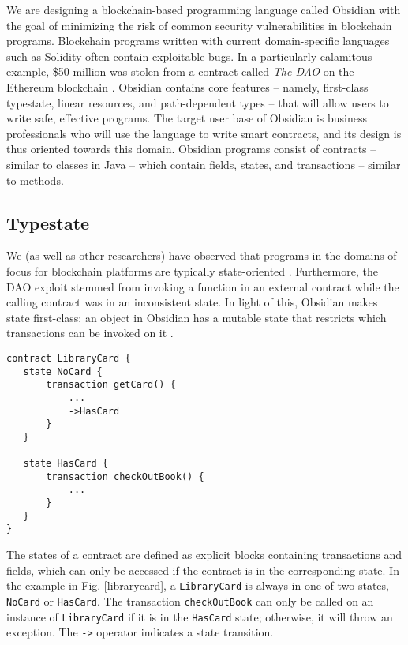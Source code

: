 \documentclass[sigplan,10pt,review]{acmart}\settopmatter{printfolios=true}
\begin{document}
We are designing a blockchain-based programming language called Obsidian \cite{Coblenz} with the goal of 
minimizing the risk of common security vulnerabilities in blockchain programs. Blockchain
programs written with current domain-specific languages such as Solidity \cite{Solidity} often contain
exploitable bugs. In a particularly calamitous example, \$50 million was stolen from a contract called \textit{The DAO} on the 
Ethereum blockchain \cite{Sirer}. Obsidian contains core features
 -- namely, first-class typestate, linear resources, and path-dependent types -- that will allow users 
to write safe, effective programs. The target 
user base of Obsidian is business professionals who will use the language to write smart contracts, 
and its design is thus oriented towards this domain. Obsidian programs consist of contracts --
similar to classes in Java -- which contain fields, states, and transactions -- similar to methods.

\subsection{Typestate}

We (as well as other researchers) have observed that programs in the domains of focus for blockchain platforms are typically state-oriented \cite{State}. Furthermore, the DAO exploit stemmed from invoking a function in an external contract while the calling contract was in an inconsistent state.
In light of this, Obsidian makes state first-class: an object in Obsidian has a mutable state that restricts which 
transactions can be invoked on it \cite{Aldrich}. 

\begin{lstlisting}[caption={An example of states in Obsidian.}, captionpos = b, label = librarycard]
contract LibraryCard {
   state NoCard {
       transaction getCard() {
           ...
           ->HasCard
       }
   }
  
   state HasCard {
       transaction checkOutBook() {
           ...
       }
   }
}
\end{lstlisting}

The states of a contract are defined as explicit blocks containing 
transactions and fields, which can only be accessed if the contract is in the corresponding state. 
In the example in Fig. \ref{librarycard}, a \texttt{\small{LibraryCard}} is always in one of two
states, \texttt{\small{NoCard}} or \texttt{\small{HasCard}}. The transaction 
\texttt{\small{checkOutBook}} can only be called on an instance of 
\texttt{\small{LibraryCard}} if it is in the \texttt{\small{HasCard}} state; otherwise, it will throw an exception. 
The \texttt{\small{->}} operator indicates a state transition.
\end{document}

